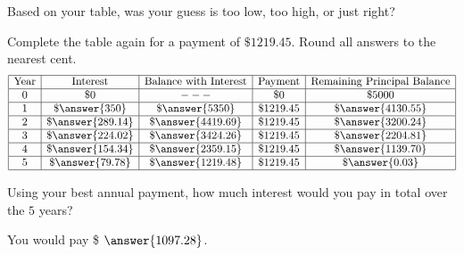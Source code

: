 \documentclass{ximera}
\begin{document}
\begin{question}
Based on your table, was your guess is too low, too high, or just
right?
\begin{multipleChoice}
\end{multipleChoice}

\end{question}

\begin{question}[0in]

  Complete the table again for a payment
  of $\$1219.45$.  Round all answers to the nearest cent.
  \[
  \begin{array}{|c|c|c|c|c|}
    \hline
    \text{Year} & \text{Interest}             & \text{Balance with Interest} & \text{Payment}    & \text{Remaining Principal Balance}\\ \hline
    0  & \$ 0               & ---                   & \$ 0        & \$ 5000 \\ \hline
    1  & \$ \answer{350}    & \$ \answer{5350}    & \$ 1219.45  & \$ \answer{4130.55} \\ \hline
    2  & \$ \answer{289.14} & \$ \answer{4419.69} & \$ 1219.45  & \$ \answer{3200.24} \\ \hline
    3  & \$ \answer{224.02} & \$ \answer{3424.26} & \$ 1219.45  & \$ \answer{2204.81} \\ \hline
    4  & \$ \answer{154.34} & \$ \answer{2359.15} & \$ 1219.45  & \$ \answer{1139.70} \\ \hline
    5  & \$ \answer{79.78}  & \$ \answer{1219.48} & \$ 1219.45  & \$ \answer{0.03} \\ \hline
    \end{array}
  \]

\end{question}

\begin{question}
Using your best annual payment, how much interest would you pay in total over the $5$ years? 
\begin{prompt}
  You would pay \$ $\answer{1097.28}$.
\end{prompt}
\end{question}

\end{document}
